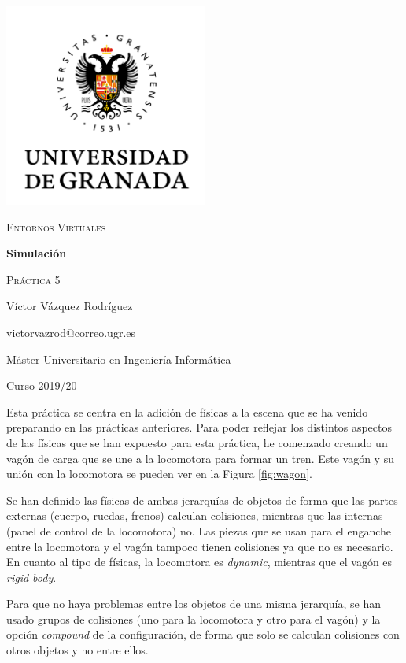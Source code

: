 \documentclass{article}
\begin{document}
\begin{titlepage}
    \centering
    \includegraphics[width=0.5\textwidth]{images/logo-ugr.png}\par
    \vspace{1cm}
    {\Large\scshape Entornos Virtuales \par}
    {\huge\bfseries Simulación \par}
    \vspace{0.2cm}
    {\scshape Práctica 5 \par}
    \vfill
    {\large Víctor Vázquez Rodríguez  \par}
    {victorvazrod@correo.ugr.es \par}
    \vfill
    {\large Máster Universitario en Ingeniería Informática \par}
    \vspace{0.2cm}
    {Curso 2019/20 \par}
\end{titlepage}

Esta práctica se centra en la adición de físicas a la escena que se ha venido
preparando en las prácticas anteriores. Para poder reflejar los distintos
aspectos de las físicas que se han expuesto para esta práctica, he comenzado
creando un vagón de carga que se une a la locomotora para formar un tren. Este
vagón y su unión con la locomotora se pueden ver en la Figura \ref{fig:wagon}.

Se han definido las físicas de ambas jerarquías de objetos de forma que las
partes externas (cuerpo, ruedas, frenos) calculan colisiones, mientras que las
internas (panel de control de la locomotora) no. Las piezas que se usan para el
enganche entre la locomotora y el vagón tampoco tienen colisiones ya que no es
necesario. En cuanto al tipo de físicas, la locomotora es \textit{dynamic},
mientras que el vagón es \textit{rigid body}.

Para que no haya problemas entre los objetos de una misma jerarquía, se han
usado grupos de colisiones (uno para la locomotora y otro para el vagón) y la
opción \textit{compound} de la configuración, de forma que solo se calculan
colisiones con otros objetos y no entre ellos.
\end{document}
